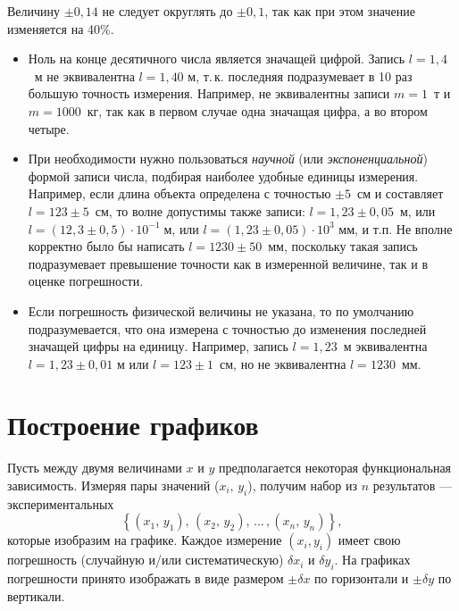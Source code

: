Величину $\pm0{,}14$ не следует округлять до $\pm0{,}1$, так как
при этом значение изменяется на 40\%.
\begin{itemize}
\item Ноль на конце десятичного числа является значащей цифрой. Запись
$l=1{,}4$~м
не эквивалентна $l=1{,}40$ м, т.\,к. последняя подразумевает в 10
раз большую точность измерения. Например, не эквивалентны записи $m=1$~т
и $m=1000$~кг, так как в первом случае одна значащая цифра, а во
втором четыре.
\item При необходимости нужно пользоваться\emph{ научной} (или
\emph{экспоненциальной})
формой записи числа, подбирая наиболее удобные единицы измерения.
Например, если длина объекта определена с точностью $\pm5$~см и
составляет $l=123\pm5$~см, то волне допустимы также записи:
$l=1{,}23\pm0{,}05$~м,
или $l=\left(12{,}3\pm0{,}5\right)\cdot10^{-1}\;\text{м}$, или
$l=\left(1{,}23\pm0{,}05\right)\cdot10^{3}\text{ мм}$,
и т.п. Не вполне корректно было бы написать $l=1230\pm50$~мм, поскольку
такая запись подразумевает превышение точности как в измеренной величине,
так и в оценке погрешности.
\item Если погрешность физической величины не указана, то по умолчанию
подразумевается,
что она измерена с точностью до изменения последней значащей цифры
на единицу. Например, запись $l=1{,}23$~м эквивалентна $l=1{,}23\pm0{,}01$
м или $l=123\pm1$~см, но не эквивалентна $l=1230$~мм.
\end{itemize}



\section{Построение графиков}
\label{sec:graph}

\normalsize

Пусть между двумя величинами $x$ и $y$ предполагается некоторая
функциональная зависимость. Измеряя пары значений ($x_{i},\,y_{i}$),
получим набор из $n$ результатов --- экспериментальных 
\[
\left\{ (x_{1},\,y_{1}),\,(x_{2},\,y_{2}),\,\ldots\,,(x_{n},\,y_{n})\right\},
\]
которые изобразим на графике. Каждое измерение $\left(x_{i},y_{i}\right)$
имеет свою погрешность (случайную и/или систематическую)
$\delta x_i$ и $\delta y_i$. На графиках погрешности принято изображать в виде  размером $\pm\delta x$ по горизонтали и 
$\pm\delta y$ по вертикали.


